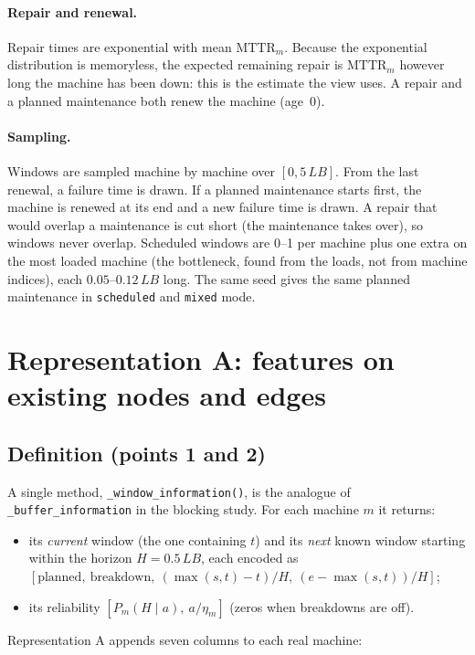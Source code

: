 \documentclass[11pt,a4paper]{article}
\newcommand{\code}[1]{\texttt{#1}}
\begin{document}
\paragraph{Repair and renewal.} Repair times are exponential with mean $\mathrm{MTTR}_m$.
Because the exponential distribution is memoryless, the expected remaining repair is
$\mathrm{MTTR}_m$ however long the machine has been down: this is the estimate the view uses.
A repair and a planned maintenance both renew the machine (age~$0$).

\paragraph{Sampling.} Windows are sampled machine by machine over $[0,5\,LB]$. From the last
renewal, a failure time is drawn. If a planned maintenance starts first, the machine is renewed
at its end and a new failure time is drawn. A repair that would overlap a maintenance is cut
short (the maintenance takes over), so windows never overlap. Scheduled windows are 0--1 per
machine plus one extra on the most loaded machine (the bottleneck, found from the loads, not
from machine indices), each $0.05$--$0.12\,LB$ long. The same seed gives the same planned
maintenance in \code{scheduled} and \code{mixed} mode.

\section{Representation A: features on existing nodes and edges}
\label{sec:repA}

\subsection{Definition (points 1 and 2)}

A single method, \code{\_window\_information()}, is the analogue of
\code{\_buffer\_information} in the blocking study. For each machine $m$ it returns:
\begin{itemize}[nosep]
  \item its \emph{current} window (the one containing $t$) and its \emph{next} known window
        starting within the horizon $H=0.5\,LB$, each encoded as
        $[\text{planned},\ \text{breakdown},\ (\max(s,t)-t)/H,\ (e-\max(s,t))/H]$;
  \item its reliability $[P_m(H\mid a),\ a/\eta_m]$ (zeros when breakdowns are off).
\end{itemize}
Representation A appends seven columns to each real machine:
\end{document}
